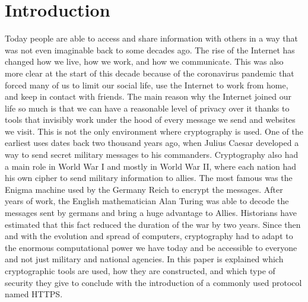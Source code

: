 \chapter{Introduction}\label{chap:introduction}
Today people are able to access and share information with others in a way that was not even imaginable back to some decades ago. The rise of the Internet has changed how we live, how we work, and how we communicate. This was also more clear at the start of this decade because of the coronavirus pandemic that forced many of us to limit our social life, use the Internet to work from home, and keep in contact with friends. The main reason why the Internet joined our life so much is that we can have a reasonable level of privacy over it thanks to tools that invisibly work under the hood of every message we send and websites we visit. This is not the only environment where cryptography is used. One of the earliest uses dates back two thousand years ago, when Julius Caesar developed a way to send secret military messages to his commanders. Cryptography also had a main role in World War I and mostly in World War II, where each nation had his own cipher to send military information to allies. The most famous was the Enigma machine used by the Germany Reich to encrypt the messages. After years of work, the English mathematician Alan Turing was able to decode the messages sent by germans and bring a huge advantage to Allies. Historians have estimated that this fact reduced the duration of the war by two years. Since then and with the evolution and spread of computers, cryptography had to adapt to the enormous computational power we have today and be accessible to everyone and not just military and national agencies. In this paper is explained which cryptographic tools are used, how they are constructed, and which type of security they give to conclude with the introduction of a commonly used protocol named HTTPS.

